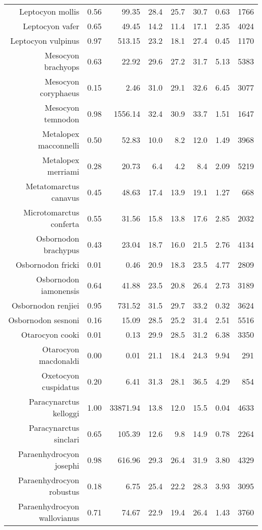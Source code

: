 \begin{table}[ht]
\begin{tabular}{rrrrrrrr}
  Leptocyon mollis & 0.56 & 99.35 & 28.4 & 25.7 & 30.7 & 0.63 & 1766 \\ 
  Leptocyon vafer & 0.65 & 49.45 & 14.2 & 11.4 & 17.1 & 2.35 & 4024 \\ 
  Leptocyon vulpinus & 0.97 & 513.15 & 23.2 & 18.1 & 27.4 & 0.45 & 1170 \\ 
  Mesocyon brachyops & 0.63 & 22.92 & 29.6 & 27.2 & 31.7 & 5.13 & 5383 \\ 
  Mesocyon coryphaeus & 0.15 & 2.46 & 31.0 & 29.1 & 32.6 & 6.45 & 3077 \\ 
  Mesocyon temnodon & 0.98 & 1556.14 & 32.4 & 30.9 & 33.7 & 1.51 & 1647 \\ 
  Metalopex macconnelli & 0.50 & 52.83 & 10.0 & 8.2 & 12.0 & 1.49 & 3968 \\ 
  Metalopex merriami & 0.28 & 20.73 & 6.4 & 4.2 & 8.4 & 2.09 & 5219 \\ 
  Metatomarctus canavus & 0.45 & 48.63 & 17.4 & 13.9 & 19.1 & 1.27 & 668 \\ 
  Microtomarctus conferta & 0.55 & 31.56 & 15.8 & 13.8 & 17.6 & 2.85 & 2032 \\ 
  Osbornodon brachypus & 0.43 & 23.04 & 18.7 & 16.0 & 21.5 & 2.76 & 4134 \\ 
  Osbornodon fricki & 0.01 & 0.46 & 20.9 & 18.3 & 23.5 & 4.77 & 2809 \\ 
  Osbornodon iamonensis & 0.64 & 41.88 & 23.5 & 20.8 & 26.4 & 2.73 & 3189 \\ 
  Osbornodon renjiei & 0.95 & 731.52 & 31.5 & 29.7 & 33.2 & 0.32 & 3624 \\ 
  Osbornodon sesnoni & 0.16 & 15.09 & 28.5 & 25.2 & 31.4 & 2.51 & 5516 \\ 
  Otarocyon cooki & 0.01 & 0.13 & 29.9 & 28.5 & 31.2 & 6.38 & 3350 \\ 
  Otarocyon macdonaldi & 0.00 & 0.01 & 21.1 & 18.4 & 24.3 & 9.94 & 291 \\ 
  Oxetocyon cuspidatus & 0.20 & 6.41 & 31.3 & 28.1 & 36.5 & 4.29 & 854 \\ 
  Paracynarctus kelloggi & 1.00 & 33871.94 & 13.8 & 12.0 & 15.5 & 0.04 & 4633 \\ 
  Paracynarctus sinclari & 0.65 & 105.39 & 12.6 & 9.8 & 14.9 & 0.78 & 2264 \\ 
  Paraenhydrocyon josephi & 0.98 & 616.96 & 29.3 & 26.4 & 31.9 & 3.80 & 4329 \\ 
  Paraenhydrocyon robustus & 0.18 & 6.75 & 25.4 & 22.2 & 28.3 & 3.93 & 3095 \\ 
  Paraenhydrocyon wallovianus & 0.71 & 74.67 & 22.9 & 19.4 & 26.4 & 1.43 & 3760 \\ 

\end{tabular}
\end{table}
